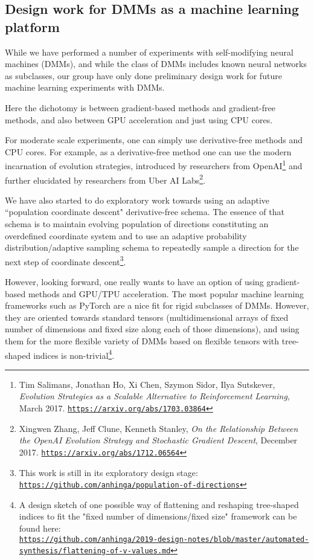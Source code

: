 \documentclass{article}
\begin{document}
\subsection{Design work for DMMs as a machine learning platform}

While we have performed a number of experiments with self-modifying neural machines (DMMs),
and while the class of DMMs includes known neural networks as subclasses,
our group have only done preliminary design work for future machine learning experiments with DMMs.

Here the dichotomy is between gradient-based methods and gradient-free methods,
and also between GPU acceleration and just using CPU cores.

For moderate scale experiments, one can simply use derivative-free methods and CPU cores.
For example, as a derivative-free method one can use the modern incarnation of evolution strategies, introduced by researchers from OpenAI\footnote{Tim Salimans, Jonathan Ho, Xi Chen, Szymon Sidor, Ilya Sutskever, {\em Evolution Strategies as a Scalable Alternative to Reinforcement Learning}, March 2017.
\href{https://arxiv.org/abs/1703.03864}{\tt https://arxiv.org/abs/1703.03864}}  and
further elucidated by researchers from Uber AI Labs\footnote{Xingwen Zhang, Jeff Clune, Kenneth Stanley,
{\em On the Relationship Between the OpenAI Evolution Strategy and Stochastic Gradient Descent}, December 2017.
\href{https://arxiv.org/abs/1712.06564}{\tt https://arxiv.org/abs/1712.06564}}. 

We have also started to do
exploratory work towards using an adaptive ``population coordinate descent" derivative-free schema. The essence of
that schema is to maintain evolving
population of directions constituting an overdefined coordinate system and to use an adaptive probability distribution/adaptive
sampling schema to repeatedly sample a direction for the next step of coordinate descent\footnote{This work is
still in its exploratory design stage: 
\href{https://github.com/anhinga/population-of-directions}{\tt https://github.com/anhinga/population-of-directions}}.

However, looking forward, one really wants to have an option of using gradient-based methods and GPU/TPU
acceleration. The most popular machine learning frameworks such as PyTorch are a nice fit for rigid subclasses
of DMMs. However, they are oriented towards standard tensors (multidimensional arrays of
fixed number of dimensions and fixed size along each of those dimensions), and using them for the more flexible variety of DMMs based on flexible tensors
with tree-shaped indices is non-trivial\footnote{A design sketch of one possible way of flattening and reshaping
tree-shaped indices to fit the "fixed number of dimensions/fixed size" framework can be found
here:\\
\href{https://github.com/anhinga/2019-design-notes/blob/master/automated-synthesis/flattening-of-v-values.md}
{\tt https://github.com/anhinga/2019-design-notes/blob/master/automated-synthesis/flattening-of-v-values.md}}.
\end{document}
